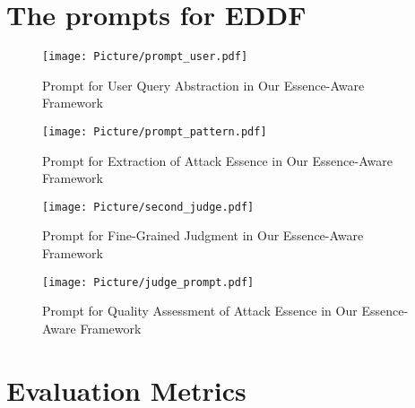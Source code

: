 \section{The prompts for EDDF}
\label{sec:appendix C}


\begin{figure}[htbp] 
    \flushleft 
    \texttt{[image: Picture/prompt\_user.pdf]}
    \captionsetup{justification=raggedright, singlelinecheck=false}
    \caption{Prompt for User Query Abstraction in Our Essence-Aware Framework}
    \label{fig_prompt}
\end{figure}

\begin{figure}[htbp] 
    \flushleft 
    \texttt{[image: Picture/prompt\_pattern.pdf]}
    \captionsetup{justification=raggedright, singlelinecheck=false}
    \caption{Prompt for Extraction of Attack Essence in Our Essence-Aware Framework}
    \label{fig_prompt1}
\end{figure}


\begin{figure}[htbp] 
    \flushleft 
    \texttt{[image: Picture/second\_judge.pdf]}
    \captionsetup{justification=raggedright, singlelinecheck=false}
    \caption{Prompt for Fine-Grained Judgment in Our Essence-Aware Framework}
    \label{fig_prompt2}
\end{figure}

\begin{figure}[htbp] 
    \flushleft 
    \texttt{[image: Picture/judge\_prompt.pdf]}
    \captionsetup{justification=raggedright, singlelinecheck=false}
    \caption{Prompt for Quality Assessment of Attack Essence in Our Essence-Aware Framework}
    \label{fig_prompt3}
\end{figure}

\section{Evaluation Metrics}
\label{sec:appendix D}

